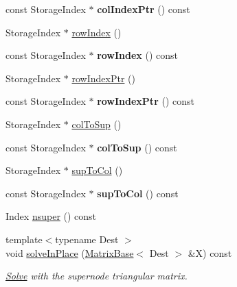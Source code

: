 \begin{DoxyCompactItemize}
\item 
\mbox{\label{class_eigen_1_1internal_1_1_mapped_super_nodal_matrix_a764f612ebc0bf7ec9118b2cabc280861}} 
const Storage\+Index $\ast$ {\bfseries col\+Index\+Ptr} () const
\item 
Storage\+Index $\ast$ \mbox{\hyperlink{class_eigen_1_1internal_1_1_mapped_super_nodal_matrix_a8e6b4f399aa468a10e58db627d43a12a}{row\+Index}} ()
\item 
\mbox{\label{class_eigen_1_1internal_1_1_mapped_super_nodal_matrix_a3194b3b2c7874afdbd0d1a19c53fd140}} 
const Storage\+Index $\ast$ {\bfseries row\+Index} () const
\item 
Storage\+Index $\ast$ \mbox{\hyperlink{class_eigen_1_1internal_1_1_mapped_super_nodal_matrix_a826186a823bf49f81b20673cce741250}{row\+Index\+Ptr}} ()
\item 
\mbox{\label{class_eigen_1_1internal_1_1_mapped_super_nodal_matrix_a45c1a5bec04eaf3da78ad2f207c30a74}} 
const Storage\+Index $\ast$ {\bfseries row\+Index\+Ptr} () const
\item 
Storage\+Index $\ast$ \mbox{\hyperlink{class_eigen_1_1internal_1_1_mapped_super_nodal_matrix_a1e2c012b63809715188aa7f0c722868d}{col\+To\+Sup}} ()
\item 
\mbox{\label{class_eigen_1_1internal_1_1_mapped_super_nodal_matrix_a1da320fc4656efe1013215ef001b7195}} 
const Storage\+Index $\ast$ {\bfseries col\+To\+Sup} () const
\item 
Storage\+Index $\ast$ \mbox{\hyperlink{class_eigen_1_1internal_1_1_mapped_super_nodal_matrix_ab2b1bdd663288f1f2af09ec42a0a62a5}{sup\+To\+Col}} ()
\item 
\mbox{\label{class_eigen_1_1internal_1_1_mapped_super_nodal_matrix_a0a613183f2c014fda26c7a539d555576}} 
const Storage\+Index $\ast$ {\bfseries sup\+To\+Col} () const
\item 
Index \mbox{\hyperlink{class_eigen_1_1internal_1_1_mapped_super_nodal_matrix_a9c0b29102914a6ef9cfd6280fa016fa8}{nsuper}} () const
\item 
{\footnotesize template$<$typename Dest $>$ }\\void \mbox{\hyperlink{class_eigen_1_1internal_1_1_mapped_super_nodal_matrix_ab93581127fd87b6bc467b6f67fcf4eeb}{solve\+In\+Place}} (\mbox{\hyperlink{class_eigen_1_1_matrix_base}{Matrix\+Base}}$<$ Dest $>$ \&X) const
\begin{DoxyCompactList}\small\item\em \mbox{\hyperlink{class_eigen_1_1_solve}{Solve}} with the supernode triangular matrix. \end{DoxyCompactList}\end{DoxyCompactItemize}

